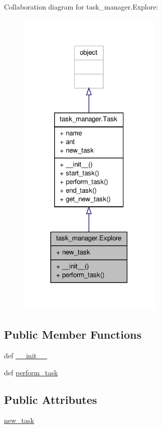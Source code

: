 Collaboration diagram for task\+\_\+manager.\+Explore\+:
\nopagebreak
\begin{figure}[H]
\begin{center}
\leavevmode
\includegraphics[width=194pt]{classtask__manager_1_1Explore__coll__graph}
\end{center}
\end{figure}
\subsection*{Public Member Functions}
\begin{DoxyCompactItemize}
\item 
def \hyperlink{classtask__manager_1_1Explore_ae95cc7a4676c07732fcf0faed752959c}{\+\_\+\+\_\+init\+\_\+\+\_\+}
\item 
def \hyperlink{classtask__manager_1_1Explore_a8ba5647950e170022bec93bc73c4a8de}{perform\+\_\+task}
\end{DoxyCompactItemize}
\subsection*{Public Attributes}
\begin{DoxyCompactItemize}
\item 
\hyperlink{classtask__manager_1_1Explore_ab1f83ac00c442f8eedd1403a59e74060}{new\+\_\+task}
\end{DoxyCompactItemize}



